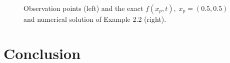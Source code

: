 \documentclass[]{article}
\begin{document}
\begin{figure}[h!]
\begin{subfigure}{.5\linewidth}
	\end{subfigure}
	\caption{Observation points (left) and the exact $f(x_p, t),\;x_p=(0.5, 0.5)$ and numerical solution of Example 2.2 (right).}
\end{figure}

\justifying
\section{Conclusion}

\newpage
{}

\end{document}
